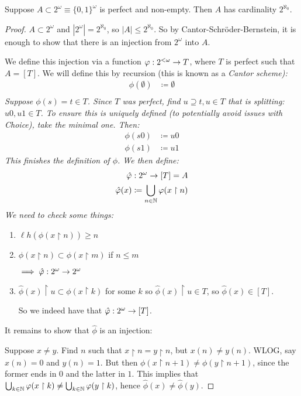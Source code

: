 \documentclass[]{article}
\newcommand{\om}{\omega}
\newcommand{\lom}{{<\omega}}
\newcommand{\lh}{\ell h}
\begin{document}
\begin{theorem*}[Cantor]
    Suppose $A\subset 2^\om \equiv \{0,1\}^\om$ is perfect and non-empty. Then $A$ has cardinality $2^{\aleph_0}$.
\end{theorem*}
\begin{proof}
    $A\subset 2^\om$ and $|2^\om| = 2^{\aleph_0}$, so $|A| \le 2^{\aleph_0}$. So by Cantor-Schr{\"o}der-Bernstein, it is enough to show that there is an injection from $2^\om$ into $A$.

    We define this injection via a function $\phi : 2^{\lom} \ra T$, where $T$ is perfect such that $A = [T]$. We will define this by recursion (this is known as a \it{Cantor scheme}):
    \begin{align*}
        \phi(\emptyset) &\coloneqq \emptyset\\
    \end{align*}
    Suppose $\phi(s) = t \in T$. Since $T$ was perfect, find $u\supseteq t, u \in T$ that is splitting: $u0,u1\in T$. To ensure this is uniquely defined (to potentially avoid issues with Choice), take the minimal one. Then:
    \begin{align*}
        \phi(s0) &\coloneqq u0\\
        \phi(s1) &\coloneqq u1
    \end{align*}
    This finishes the definition of $\phi$. We then define:
    \begin{align*}
        \hat{\phi}&:2^\om \ra [T] = A\\
        \hat{\phi}(x)&\coloneqq \bigcup_{n\in \N}\phi(x\restriction n)
    \end{align*}
    We need to check some things:
    \begin{enumerate}
        \item $\lh(\phi(x\restriction n)) \ge n$
        \item $\phi(x\restriction n)\subset \phi(x\restriction m)$ if $n\le m$
        
        $\implies \hat{\phi}:2^\om\ra2^\om$

        \item $\hat{\phi}(x)\restriction u\subset \phi(x\restriction k)$ for some $k$ so $\hat{\phi}(x)\restriction u\in T$, so $\hat{\phi}(x)\in [T]$.
        
        So we indeed have that $\hat{\phi}:2^\om \ra [T]$.
    \end{enumerate}

    It remains to show that $\hat{\phi}$ is an injection:

    Suppose $x\ne y$. Find $n$ such that $x\restriction n = y\restriction n$, but $x(n)\ne y(n)$. WLOG, say $x(n) = 0$ and $y(n) = 1$. But then $\phi(x\restriction n+1)\ne \phi(y\restriction n+1)$, since the former ends in $0$ and the latter in $1$. This implies that $\bigcup_{k\in \mathbb{N}}\varphi(x\restriction k)\ne \bigcup_{k\in \mathbb{N}}\varphi(y\restriction k)$, hence $\hat{\phi}(x)\ne \hat{\phi}(y)$.
\end{proof}
\end{document}
